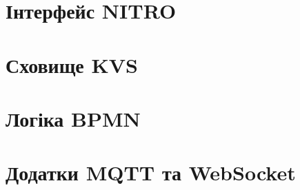 \newpage
\section{Інтерфейс NITRO}

\section{Сховище KVS}

\section{Логіка BPMN}



\section{Додатки MQTT та WebSocket}

